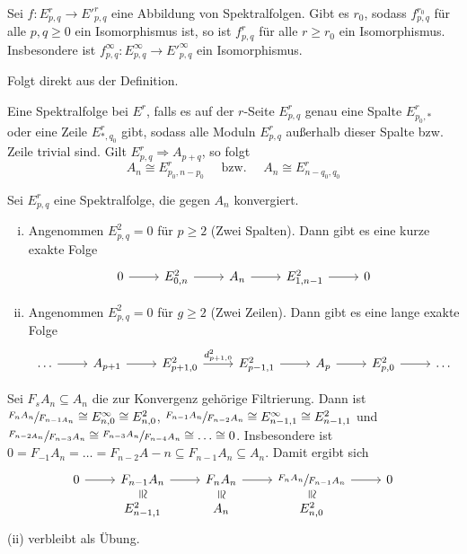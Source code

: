 \begin{satz}[{name={Abbildungslemma}},label=abb.lemma]
	Sei $f \colon E^r_{p,q} \to {E'}^r_{p,q}$ eine Abbildung von Spektralfolgen. 
	Gibt es $r_0$, sodass $f^{r_0}_{p,q}$ für alle $p,q \ge 0$ ein Isomorphismus ist, so ist $f^r_{p,q}$ für alle $r\ge r_0$ ein Isomorphismus.
	Insbesondere ist $f^\infty_{p,q} \colon E^\infty_{p,q} \to {E'}^\infty_{p,q}$ ein Isomorphismus.
\end{satz}
\begin{beweis}
	Folgt direkt aus der Definition.
\end{beweis}

\begin{bemerkung}[{name=[kollabierende Spektralfolge]}]
	Eine Spektralfolge  bei $E^r$, falls es auf der $r$-Seite $E^r_{p,q}$ genau eine Spalte $E^r_{p_0,*}$ oder eine Zeile $E^r_{*,q_0}$ gibt, sodass alle Moduln $E^r_{p,q}$ außerhalb dieser Spalte bzw. Zeile trivial sind.
	Gilt $E^r_{p,q}\Rightarrow A_{p+q}$, so folgt 
	\[
		A_n \cong E^r_{p_0,n-p_0} \quad \text{ bzw. } \quad A_n \cong E^r_{n-q_0,q_0}
	\]
\end{bemerkung}

\begin{lemma}
	Sei $E^r_{p,q}$ eine Spektralfolge, die gegen $A_n$ konvergiert. 
	\begin{enumerate}[(i)]
		\item Angenommen $E^2_{p,q}=0$ für $p\ge 2$ (Zwei Spalten).
		Dann gibt es eine kurze exakte Folge 
		\[
			\begin{tikzcd}
				0 \rar & E^2_{0,n} \rar & A_n \rar & E^2_{1,n-1} \rar & 0
			\end{tikzcd}
		\]
		\item Angenommen $E^2_{p,q}=0$ für $g \ge 2$ (Zwei Zeilen). Dann gibt es eine lange exakte Folge
		\[
			\begin{tikzcd}
				\ldots \rar & A_{p+1} \rar & E^2_{p+1,0} \rar["d^2_{p+1,0}"] & E^2_{p-1,1} \rar & A_p \rar & E^2_{p,0} \rar & \ldots 
			\end{tikzcd}
		\] 
	\end{enumerate}
\end{lemma}
\begin{beweis}
	Sei $F_s A_n \subseteq A_n$ die zur Konvergenz gehörige Filtrierung. 
	Dann ist $\sfrac{F_n A_n}{F_{n-1 A_n}} \cong E^\infty_{n,0} \cong E^2_{n,0}$, $\sfrac{F_{n-1} A_n}{F_{n-2} A_n} \cong E^\infty_{n-1,1} \cong E^2_{n-1,1}$ und 
	$\sfrac{F_{n-2 A_n}}{F_{n-3}A_n} \cong  \sfrac{F_{n-3} A_n}{F_{n-4} A_n} \cong \ldots \cong 0$.
	Insbesondere ist $0 = F_{-1} A_n = \ldots = F_{n-2}A-n \subseteq F_{n-1} A_n \subseteq A_n$.
	Damit ergibt sich
	\[
		\begin{tikzcd}[row sep=5pt]
			0 \rar & F_{n-1} A_n \rar \dar[phantom,"\cong", sloped] & F_n A_n \rar\dar[phantom,"\cong", sloped] & \sfrac{F_n A_n}{F_{n-1} A_n} \rar\dar[phantom,"\cong", sloped] &0  \\
			& E^2_{n-1,1} & A_n & E_{n,0}^2
		\end{tikzcd}
	\]
	(ii) verbleibt als Übung.
\end{beweis}

